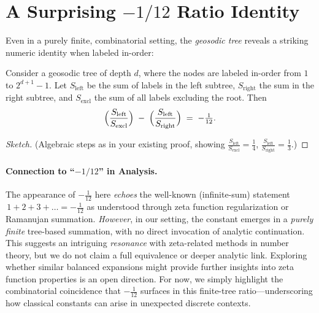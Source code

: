 \section{A Surprising \texorpdfstring{$-1/12$}{-1/12} Ratio Identity}
\label{sec:ratio}

Even in a purely finite, combinatorial setting, the \emph{geosodic tree} 
reveals a striking numeric identity when labeled in-order:

\begin{theorem}
\label{thm:minus-twelfth}
Consider a geosodic tree of depth $d$, where the nodes are labeled in-order 
from $1$ to $2^{d+1}-1$. Let $S_{\text{left}}$ be the sum of labels in the 
left subtree, $S_{\text{right}}$ the sum in the right subtree, and 
$S_{\text{excl}}$ the sum of all labels excluding the root. Then
\[
\Bigl(\frac{S_{\text{left}}}{S_{\text{excl}}}\Bigr)
\;-\;
\Bigl(\frac{S_{\text{left}}}{S_{\text{right}}}\Bigr)
\;=\;
-\tfrac{1}{12}.
\]
\end{theorem}

\begin{proof}[Sketch]
(Algebraic steps as in your existing proof, showing 
\(\tfrac{S_{\text{left}}}{S_{\text{excl}}} = \frac{1}{4}\),
\(\tfrac{S_{\text{left}}}{S_{\text{right}}} = \frac{1}{3}\).)
\end{proof}

\paragraph{Connection to ``\texorpdfstring{$-1/12$}{-1/12}'' in Analysis.}
The appearance of $-\tfrac{1}{12}$ here \emph{echoes} the well-known 
(infinite-sum) statement $\,1 + 2 + 3 + \dots = -\tfrac{1}{12}$ 
as understood through zeta function regularization or Ramanujan summation. 
\emph{However}, in our setting, the constant emerges in a \emph{purely finite} 
tree-based summation, with no direct invocation of analytic continuation. 
This suggests an intriguing \emph{resonance} with zeta-related methods 
in number theory, but we do not claim a full equivalence or deeper analytic link. 
Exploring whether similar balanced expansions might provide further insights 
into zeta function properties is an open direction. For now, we simply highlight 
the combinatorial coincidence that $-\tfrac{1}{12}$ surfaces in this 
finite-tree ratio---underscoring how classical constants can arise 
in unexpected discrete contexts.
